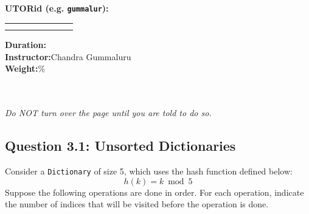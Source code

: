 \documentclass[12pt]{article}
\begin{document}
\noindent \textbf{UTORid (e.g. \texttt{gummalur}):} \begin{table}[H]
\begin{tabular}{|c|c|c|c|c|c|c|c|}
\hline
\hspace{1.2em}\; & \hspace{1.2em}\; & \hspace{1.2em}\; & \hspace{1.2em}\; & \hspace{1.2em}\; & \hspace{1.2em}\; & \hspace{1.2em}\; & \hspace{1.2em}\; \\
\hspace{1.2em}\; & \hspace{1.2em}\; & \hspace{1.2em}\; & \hspace{1.2em}\; & \hspace{1.2em}\; & \hspace{1.2em}\; & \hspace{1.2em}\; & \hspace{1.2em}\;\\\hline
\end{tabular}%
\end{table}
\noindent \textbf{Duration:}\\
\textbf{Instructor:}\dotfilltext Chandra Gummaluru\\
\textbf{Weight:}\% \\
\\~\\
\begin{center}
\textit{Do NOT turn over the page until you are told to do so.}
\end{center}

\clearpage

\setlength\parindent{0pt}
\subsection*{Question 3.1: Unsorted Dictionaries}
Consider a \texttt{Dictionary} of size 5, which uses the hash function defined below:
\[
h(k) = k \bmod 5
\]
Suppose the following operations are done in order. For each operation, indicate the number of indices that will be visited before the operation is done. \\
\end{document}
